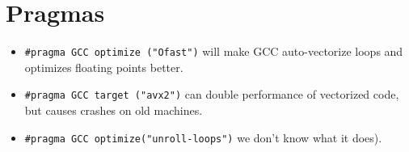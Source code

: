 \section*{Pragmas}
	\begin{itemize}
		\item \lstinline{#pragma GCC optimize ("Ofast")} will make GCC auto-vectorize loops and optimizes floating points better.
		\item \lstinline{#pragma GCC target ("avx2")} can double performance of vectorized code, but causes crashes on old machines.
		\item \lstinline{#pragma GCC optimize("unroll-loops")} we don't know what it does).
	\end{itemize}
